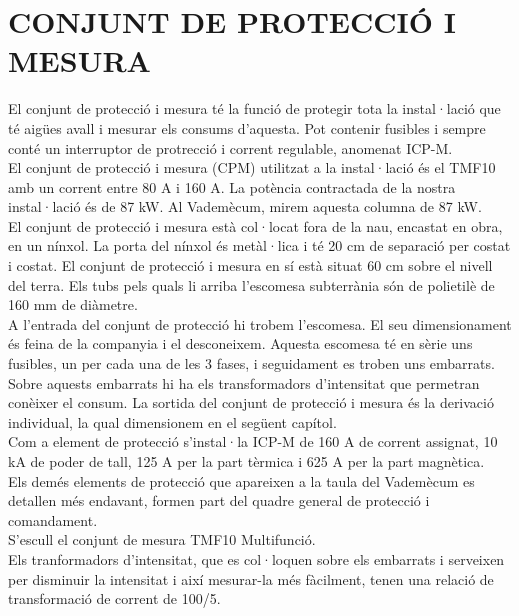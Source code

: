 \chapter{\uppercase{Conjunt de protecció i mesura}}
El conjunt de protecció i mesura té la funció de protegir tota la instal·lació que té aigües avall i mesurar els consums d'aquesta. Pot contenir fusibles i sempre conté un interruptor de protrecció i corrent regulable, anomenat ICP-M.\\
\newline El conjunt de protecció i mesura (CPM) utilitzat a la instal·lació és el TMF10 amb un corrent entre 80 A i 160 A. La potència contractada de la nostra instal·lació és de 87 kW. Al Vademècum, mirem aquesta columna de 87 kW.\\
\newline
El conjunt de protecció i mesura està col·locat fora de la nau, encastat en obra, en un nínxol. La porta del nínxol és metàl·lica i té 20 cm de separació per costat i costat. El conjunt de protecció i mesura en sí està situat 60 cm sobre el nivell del terra. Els tubs pels quals li arriba l'escomesa subterrània són de polietilè de 160 mm de diàmetre.\\
\newline
A l'entrada del conjunt de protecció hi trobem l'escomesa. El seu dimensionament és feina de la companyia i el desconeixem. Aquesta escomesa té en sèrie uns fusibles, un per cada una de les 3 fases, i seguidament es troben uns embarrats. Sobre aquests embarrats hi ha els transformadors d'intensitat que permetran conèixer el consum. La sortida del conjunt de protecció i mesura és la derivació individual, la qual dimensionem en el següent capítol.\\
\newline
Com a element de protecció s'instal·la ICP-M de 160 A de corrent assignat, 10 kA de poder de tall, 125 A per la part tèrmica i 625 A per la part magnètica.\\
\newline Els demés elements de protecció que apareixen a la taula del Vademècum es detallen més endavant, formen part del quadre general de protecció i comandament.\\
\newline
S'escull el conjunt de mesura TMF10 Multifunció.\\
\newline Els tranformadors d'intensitat, que es col·loquen sobre els embarrats i serveixen per disminuir la intensitat i així mesurar-la més fàcilment, tenen una relació de transformació de corrent de 100/5.\\
